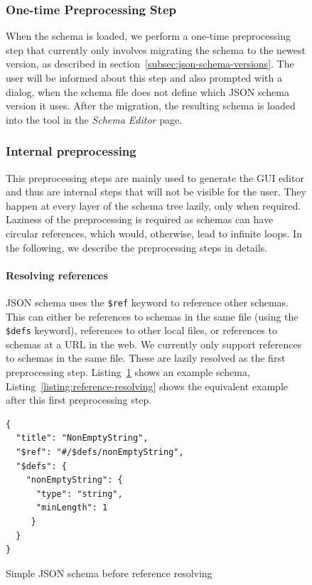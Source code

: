 \begin{figure}[h]
\subsubsection{One-time Preprocessing Step}
When the schema is loaded, we perform a one-time preprocessing step that currently only involves migrating the schema to the newest version,
as described in section~\ref{subsec:json-schema-versions}.
The user will be informed about this step and also prompted with a dialog, when the schema file does not define which JSON schema version it uses.
After the migration, the resulting schema is loaded into the tool in the \textit{Schema Editor} page.


\subsubsection{Internal preprocessing}
This preprocessing steps are mainly used to generate the GUI editor and thus are internal steps that will not be visible for the user.
They happen at every layer of the schema tree lazily, only when required.
Laziness of the preprocessing is required as schemas can have circular references, which would, otherwise, lead to infinite loops.
In the following, we describe the preprocessing steps in details.

\paragraph{Resolving references}
JSON schema uses the \texttt{\$ref} keyword to reference other schemas.
This can either be references to schemas in the same file (using the \texttt{\$defs} keyword), references to other local files,
or references to schemas at a URL in the web.
We currently only support references to schemas in the same file.
These are lazily resolved as the first preprocessing step.
Listing~\ref{listing:preprocessing-example} shows an example schema, Listing~\ref{listing:reference-resolving} shows the equivalent example after
this first preprocessing step.

\begin{listing}[!h]
    \begin{verbatim}
{
  "title": "NonEmptyString",
  "$ref": "#/$defs/nonEmptyString",
  "$defs": {
    "nonEmptyString": {
      "type": "string",
      "minLength": 1
     }
  }
}
    \end{verbatim}
    \caption{Simple JSON schema before reference resolving}
    \label{listing:preprocessing-example}
\end{listing}


\end{figure}
